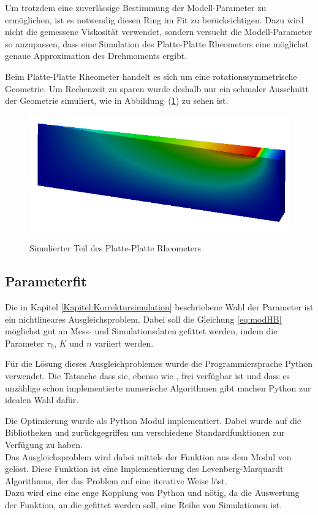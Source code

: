 Um trotzdem eine zuverlässige Bestimmung der Modell-Parameter zu ermöglichen, ist es notwendig diesen Ring im Fit zu berücksichtigen. Dazu wird nicht die gemessene Viskosität verwendet, sondern versucht die Modell-Parameter so anzupassen, dass eine Simulation des Platte-Platte Rheometers eine möglichst genaue Approximation des Drehmoments ergibt.

Beim Platte-Platte Rheometer handelt es sich um eine rotationssymmetrische Geometrie. Um Rechenzeit zu sparen wurde deshalb nur ein schmaler Ausschnitt der Geometrie simuliert, wie in Abbildung~(\ref{fig:plattePlatteRheo})  zu sehen ist.\\
\begin{figure}
\centering
\includegraphics[width=.6\textwidth]{figures/plattenRheometerSchnitz.png}
\label{fig:plattePlatteRheo}
\caption{Simulierter Teil des Platte-Platte Rheometers}
\end{figure}
%
\subsection{Parameterfit}
Die in Kapitel \ref{Kapitel:Korrektursimulation} beschriebene Wahl der Parameter ist ein nichtlineares Ausgleichsproblem. Dabei soll die Gleichung \eqref{eq:modHB} möglichst gut an Mess- und Simulationsdaten gefittet werden, indem die Parameter $\tau_0$, $K$ und $n$ variiert werden.

Für die Lösung dieses Ausgleichproblemes wurde die Programmiersprache Python verwendet. Die Tatsache dass sie, ebenso wie \openfoam{}, frei verfügbar ist und dass es unzählige schon implementierte numerische Algorithmen gibt machen Python zur idealen Wahl dafür.

Die Optimierung wurde als Python Modul  implementiert. Dabei wurde auf die Bibliotheken  und  \cite{scipy} zurückgegriffen um verschiedene Standardfunktionen zur Verfügung zu haben.\\
Das Ausgleichsproblem wird dabei mittels der Funktion  aus dem Modul  von  gelöst.
Diese Funktion ist eine Implementierung des Levenberg-Marquardt Algorithmus, der das Problem auf eine iterative Weise löst.\\
Dazu wird eine eine enge Kopplung von Python und \openfoam{} nötig, da die Auswertung der Funktion, an die gefittet werden soll, eine Reihe von Simulationen ist.

